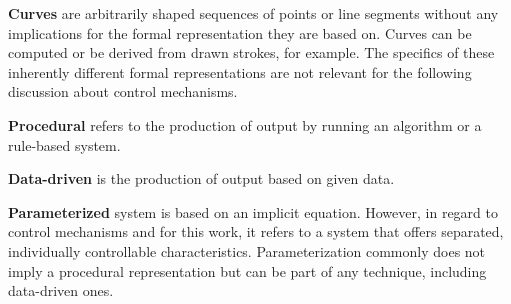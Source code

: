 \textbf{Curves} are arbitrarily shaped sequences of points or line segments without any implications for the formal representation they are based on. Curves can be computed or be derived from drawn strokes, for example. The specifics of these inherently different formal representations are not relevant for the following discussion about control mechanisms.

\textbf{Procedural} refers to the production of output by running an algorithm or a rule-based system.

\textbf{Data-driven} is the production of output based on given data.

\textbf{Parameterized} system is based on an implicit equation. However, in regard to control mechanisms and for this work, it refers to a system that offers separated, individually controllable characteristics. Parameterization commonly does not imply a procedural representation but can be part of any technique, including data-driven ones.
